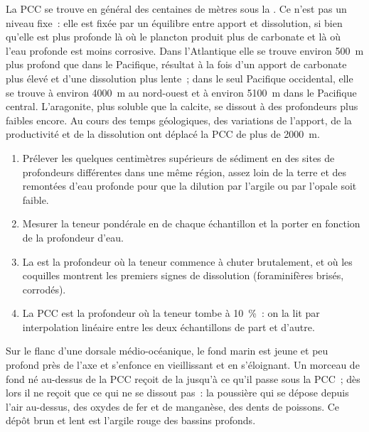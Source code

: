 La PCC se trouve en général des centaines de mètres sous la . Ce n'est pas un niveau
fixe~: elle est fixée par un équilibre entre apport et dissolution, si bien qu'elle est
plus profonde là où le plancton produit plus de carbonate et là où l'eau profonde est
moins corrosive. Dans l'Atlantique elle se trouve environ \qty{500}{m} plus profond que dans le
Pacifique, résultat à la fois d'un apport de carbonate plus élevé et d'une dissolution plus lente~; dans
le seul Pacifique occidental, elle se trouve à environ \qty{4000}{m} au nord-ouest et
à environ \qty{5100}{m} dans le Pacifique central. L'aragonite, plus soluble que la
calcite, se dissout à des profondeurs plus faibles encore. Au cours des temps géologiques, des variations de
l'apport, de la productivité et de la dissolution ont déplacé la PCC de plus de
\qty{2000}{m}.

\begin{method}\label{met:b1:chemical-biogenic-sediments:ccd}
\begin{enumerate}
  \item Prélever les quelques centimètres supérieurs de sédiment en des sites de profondeurs différentes
        dans une même région, assez loin de la terre et des remontées d'eau profonde pour que la dilution par
        l'argile ou par l'opale soit faible.
  \item Mesurer la teneur pondérale en  de chaque échantillon et la porter
        en fonction de la profondeur d'eau.
  \item La  est la profondeur où la teneur commence à chuter brutalement,
        et où les coquilles montrent les premiers signes de dissolution (foraminifères
        brisés, corrodés).
  \item La PCC est la profondeur où la teneur tombe à \qty{10}{\%}~: on la lit
        par interpolation linéaire entre les deux échantillons de part et d'autre.
\end{enumerate}
\end{method}

Sur le flanc d'une dorsale médio-océanique, le fond marin est jeune et peu profond près de
l'axe et s'enfonce en vieillissant et en s'éloignant. Un morceau de fond né au-dessus de la PCC
reçoit de la  jusqu'à ce qu'il passe sous la PCC~; dès lors il ne reçoit
que ce qui ne se dissout pas~: la poussière qui se dépose depuis l'air au-dessus, des oxydes de fer et de
manganèse, des dents de poissons. Ce dépôt brun et lent est l'argile rouge
des bassins profonds.

